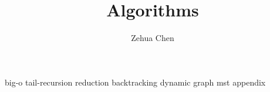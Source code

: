 \documentclass{../../../shared/latex/notes}
\title{Algorithms}
\author{Zehua Chen}
\begin{document}
  \maketitle
  \tableofcontents

  {big-o}
  {tail-recursion}
  {reduction}
  {backtracking}
  {dynamic}
  {graph}
  {mst}
  {appendix}
\end{document}

